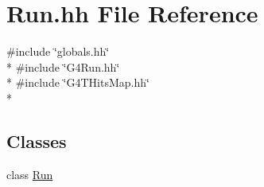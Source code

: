 \hypertarget{_run_8hh}{\section{Run.\-hh File Reference}
\label{_run_8hh}
}
{\ttfamily \#include \char`\"{}globals.\-hh\char`\"{}}\\*
{\ttfamily \#include \char`\"{}G4\-Run.\-hh\char`\"{}}\\*
{\ttfamily \#include \char`\"{}G4\-T\-Hits\-Map.\-hh\char`\"{}}\\*
\subsection*{Classes}
\begin{DoxyCompactItemize}
\item 
class \hyperlink{class_run}{Run}
\end{DoxyCompactItemize}
